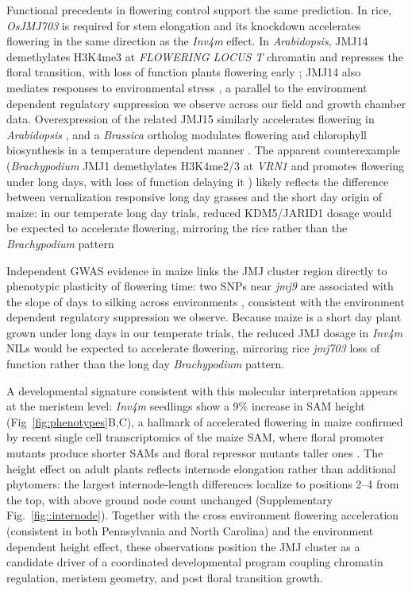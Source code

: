 \documentclass[9pt,twocolumn,twoside]{rilabRxiv}
\newcommand{\invfour}{\textit{Inv4m}\xspace}
\begin{document}
Functional precedents in flowering control support the same prediction. 
In rice, \textit{OsJMJ703} is required for stem elongation \citep{chen2013} and its knockdown accelerates flowering \citep{song2019-jm} in the same direction as the \invfour effect. 
In \textit{Arabidopsis}, JMJ14 demethylates H3K4me3 at \textit{FLOWERING LOCUS T} chromatin and represses the floral transition, with loss of function plants flowering early \citep{Lu2010-bn, yang2012a}; JMJ14 also mediates responses to environmental stress \citep{Cui2021-sf, Sun2021-ib}, a parallel to the environment dependent regulatory suppression we observe across our field and growth chamber data. 
Overexpression of the related JMJ15 similarly accelerates flowering in \textit{Arabidopsis} \citep{yang2012b}, and a \textit{Brassica} ortholog modulates flowering and chlorophyll biosynthesis in a temperature dependent manner \citep{Xin2024-zb}. 
The apparent counterexample (\textit{Brachypodium} JMJ1 demethylates H3K4me2/3 at \textit{VRN1} and promotes flowering under long days, with loss of function delaying it \citep{Liu2024-aq}) likely reflects the difference between vernalization responsive long day grasses and the short day origin of maize: in our temperate long day trials, reduced KDM5/JARID1 dosage would be expected to accelerate flowering, mirroring the rice rather than the \textit{Brachypodium} pattern

Independent GWAS evidence in maize links the JMJ cluster region directly to phenotypic plasticity of flowering time: two SNPs near \textit{jmj9} are associated with the slope of days to silking across environments \citep{tibbs-cortes2024}, consistent with the environment dependent regulatory suppression we observe.
Because maize is a short day plant grown under long days in our temperate trials, the reduced JMJ dosage in \invfour NILs would be expected to accelerate flowering, mirroring rice \textit{jmj703} loss of function rather than the long day \textit{Brachypodium} pattern.

\clearpage
 
A developmental signature consistent with this molecular interpretation appears at the meristem level: \invfour seedlings show a 9\% increase in SAM height (Fig~\ref{fig:phenotypes}B,C), a hallmark of accelerated flowering in maize \citep{danilevskaya2008, wu2008, leiboff2015, thompson2015} confirmed by recent single cell transcriptomics of the maize SAM, where floral promoter mutants produce shorter SAMs and floral repressor mutants taller ones \citep{dong2026}.
The height effect on adult plants reflects internode elongation rather than additional phytomers: the largest internode-length differences localize to positions 2--4 from the top, with above ground node count unchanged (Supplementary Fig.~\ref{fig::internode}).
Together with the cross environment flowering acceleration (consistent in both Pennsylvania and North Carolina) and the environment dependent height effect, these observations position the JMJ cluster as a candidate driver of a coordinated developmental program coupling chromatin regulation, meristem geometry, and post floral transition growth.
 
\end{document}
